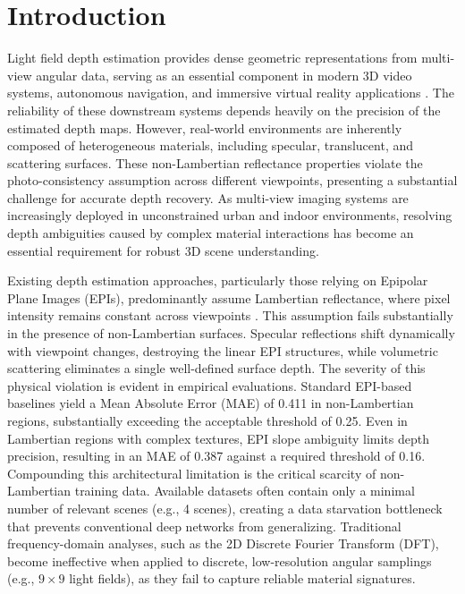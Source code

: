 \section{Introduction}

Light field depth estimation provides dense geometric representations from multi-view angular data, serving as an essential component in modern 3D video systems, autonomous navigation, and immersive virtual reality applications . The reliability of these downstream systems depends heavily on the precision of the estimated depth maps. However, real-world environments are inherently composed of heterogeneous materials, including specular, translucent, and scattering surfaces. These non-Lambertian reflectance properties violate the photo-consistency assumption across different viewpoints, presenting a substantial challenge for accurate depth recovery. As multi-view imaging systems are increasingly deployed in unconstrained urban and indoor environments, resolving depth ambiguities caused by complex material interactions has become an essential requirement for robust 3D scene understanding.

Existing depth estimation approaches, particularly those relying on Epipolar Plane Images (EPIs), predominantly assume Lambertian reflectance, where pixel intensity remains constant across viewpoints . This assumption fails substantially in the presence of non-Lambertian surfaces. Specular reflections shift dynamically with viewpoint changes, destroying the linear EPI structures, while volumetric scattering eliminates a single well-defined surface depth. The severity of this physical violation is evident in empirical evaluations. Standard EPI-based baselines yield a Mean Absolute Error (MAE) of 0.411 in non-Lambertian regions, substantially exceeding the acceptable threshold of 0.25. Even in Lambertian regions with complex textures, EPI slope ambiguity limits depth precision, resulting in an MAE of 0.387 against a required threshold of 0.16. Compounding this architectural limitation is the critical scarcity of non-Lambertian training data. Available datasets often contain only a minimal number of relevant scenes (e.g., 4 scenes), creating a data starvation bottleneck that prevents conventional deep networks from generalizing. Traditional frequency-domain analyses, such as the 2D Discrete Fourier Transform (DFT), become ineffective when applied to discrete, low-resolution angular samplings (e.g., $9 \times 9$ light fields), as they fail to capture reliable material signatures.

